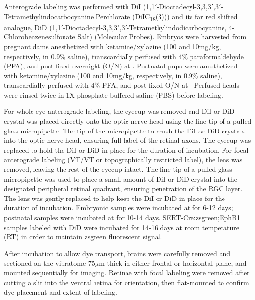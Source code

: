Anterograde labeling was performed with DiI (1,1$'$-Dioctadecyl-3,3,3$'$,3$'$-Tetramethylindocarbocyanine Perchlorate (DiIC\textsubscript{18}(3))) and its far red shifted analogue, DiD (1,1$'$-Dioctadecyl-3,3,3$'$,3$'$-Tetramethylindodicarbocyanine, 4-Chlorobenzenesulfonate Salt) (Molecular Probes).
Embryos were harvested from pregnant dams anesthetized with ketamine/xylazine (100 and 10mg/kg, respectively, in 0.9\% saline), transcardially perfused with 4\% paraformaldehyde (PFA), and post-fixed overnight (O/N) at .
Postnatal pups were anesthetized with ketamine/xylazine (100 and 10mg/kg, respectively, in 0.9\% saline), transcardially perfused with 4\% PFA, and post-fixed O/N at .
Perfused heads were rinsed twice in 1X phosphate buffered saline (PBS) before labeling.

For whole eye anterograde labeling, the eyecup was removed and DiI or DiD crystal was placed directly onto the optic nerve head using the fine tip of a pulled glass micropipette.
The tip of the micropipette to crush the DiI or DiD crystals into the optic nerve head, ensuring full label of the retinal axons.
The eyecup was replaced to hold the DiI or DiD in place for the duration of incubation.
For focal anterograde labeling (VT/VT or topographically restricted label), the lens was removed, leaving the rest of the eyecup intact.
The fine tip of a pulled glass micropipette was used to place a small amount of DiI or DiD crystal into the designated peripheral retinal quadrant, ensuring penetration of the RGC layer.
The lens was gently replaced to help keep the DiI or DiD in place for the duration of incubation.
Embryonic samples were incubated at  for 6-12 days; postnatal samples were incubated at  for 10-14 days.
SERT-Cre:zsgreen;EphB1 samples labeled with DiD were incubated for 14-16 days at room temperature (RT) in order to maintain zsgreen fluorescent signal.

After incubation to allow dye transport, brains were carefully removed and sectioned on the vibratome 75$\mu$m thick in either frontal or horizontal plane, and mounted sequentially for imaging.
Retinae with focal labeling were removed after cutting a slit into the ventral retina for orientation, then flat-mounted to confirm dye placement and extent of labeling.
